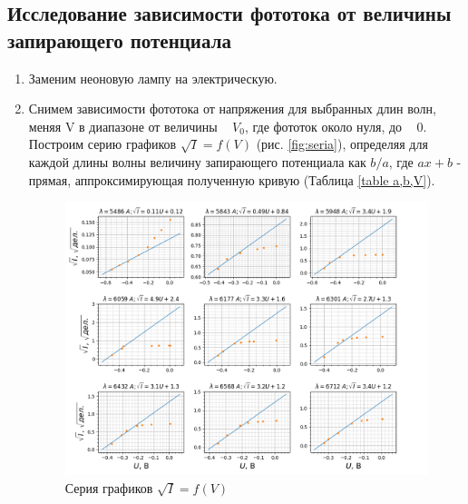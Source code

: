 \documentclass[a4paper,12pt]{article}
\begin{document}
\subsection{Исследование зависимости фототока от величины запирающего потенциала}
\begin{enumerate}
 

\item Заменим неоновую лампу на электрическую.

 \item Снимем зависимости фототока от напряжения для выбранных длин волн, меняя V в диапазоне от величины ~ $V_0$, где фототок около нуля, до ~ 0.  Построим серию графиков $\sqrt{I} = f(V)$ (рис. \eqref{fig:seria}), определяя для каждой длины волны величину запирающего потенциала как  $b/a$, где $ax+b$ - прямая, аппроксимирующая полученную кривую (Таблица \eqref{table a,b,V}). 

\begin{figure}[h!]
    \centering
    \includegraphics[scale = 0.69]{5.5.1!!.png}
    \caption{Серия графиков $\sqrt{I} = f(V)$}
    \label{fig:seria}
\end{figure}





\end{enumerate}
\end{document}
